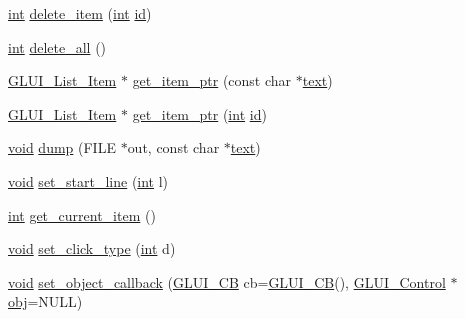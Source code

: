 \begin{DoxyCompactItemize}
\item 
\hyperlink{wglext_8h_a500a82aecba06f4550f6849b8099ca21}{int} \hyperlink{class_g_l_u_i___list_a1de769c475c514a2bfccf92552be8dba}{delete\+\_\+item} (\hyperlink{wglext_8h_a500a82aecba06f4550f6849b8099ca21}{int} \hyperlink{glext_8h_a58c2a664503e14ffb8f21012aabff3e9}{id})
\item 
\hyperlink{wglext_8h_a500a82aecba06f4550f6849b8099ca21}{int} \hyperlink{class_g_l_u_i___list_a68eaa8654adcd307c89e8235a049f4bf}{delete\+\_\+all} ()
\item 
\hyperlink{class_g_l_u_i___list___item}{G\+L\+U\+I\+\_\+\+List\+\_\+\+Item} $\ast$ \hyperlink{class_g_l_u_i___list_a19a4b7f15cc0f9c13b1b431496da3067}{get\+\_\+item\+\_\+ptr} (const char $\ast$\hyperlink{class_g_l_u_i___control_af0d60e9736f4dbc34e9a536e75876d72}{text})
\item 
\hyperlink{class_g_l_u_i___list___item}{G\+L\+U\+I\+\_\+\+List\+\_\+\+Item} $\ast$ \hyperlink{class_g_l_u_i___list_a9deed6a467c88c619d47b448153af602}{get\+\_\+item\+\_\+ptr} (\hyperlink{wglext_8h_a500a82aecba06f4550f6849b8099ca21}{int} \hyperlink{glext_8h_a58c2a664503e14ffb8f21012aabff3e9}{id})
\item 
\hyperlink{wglext_8h_a9e6b7f1933461ef318bb000d6bd13b83}{void} \hyperlink{class_g_l_u_i___list_a89ccf441e37470107e513305f2d33f04}{dump} (F\+I\+L\+E $\ast$out, const char $\ast$\hyperlink{class_g_l_u_i___control_af0d60e9736f4dbc34e9a536e75876d72}{text})
\item 
\hyperlink{wglext_8h_a9e6b7f1933461ef318bb000d6bd13b83}{void} \hyperlink{class_g_l_u_i___list_ad0b1a917f4e192aaabc53bb8240c5cc5}{set\+\_\+start\+\_\+line} (\hyperlink{wglext_8h_a500a82aecba06f4550f6849b8099ca21}{int} l)
\item 
\hyperlink{wglext_8h_a500a82aecba06f4550f6849b8099ca21}{int} \hyperlink{class_g_l_u_i___list_a68ed3cc0219ba9ed96107c10d36e5ea4}{get\+\_\+current\+\_\+item} ()
\item 
\hyperlink{wglext_8h_a9e6b7f1933461ef318bb000d6bd13b83}{void} \hyperlink{class_g_l_u_i___list_a6ef479e96208a8167bc6f13c235542ba}{set\+\_\+click\+\_\+type} (\hyperlink{wglext_8h_a500a82aecba06f4550f6849b8099ca21}{int} d)
\item 
\hyperlink{wglext_8h_a9e6b7f1933461ef318bb000d6bd13b83}{void} \hyperlink{class_g_l_u_i___list_a97cb9eaebaa4b9748c7d1dcb0225b3ce}{set\+\_\+object\+\_\+callback} (\hyperlink{class_g_l_u_i___c_b}{G\+L\+U\+I\+\_\+\+C\+B} cb=\hyperlink{class_g_l_u_i___c_b}{G\+L\+U\+I\+\_\+\+C\+B}(), \hyperlink{class_g_l_u_i___control}{G\+L\+U\+I\+\_\+\+Control} $\ast$\hyperlink{glext_8h_a0c0d4701a6c89f4f7f0640715d27ab26}{obj}=N\+U\+L\+L)
\end{DoxyCompactItemize}
